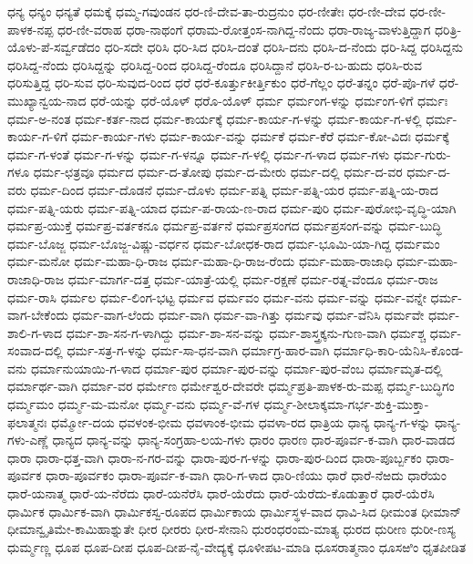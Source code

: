ಧನ್ಯ
ಧನ್ಯಂ
ಧನ್ಯತೆ
ಧಮಕ್ಕೆ
ಧಮ್ಮ-ಗವುಂಡನ
ಧರ-ಣಿ-ದೇವ-ತಾ-ರುದ್ರನುಂ
ಧರ-ಣೀತೇಃ
ಧರ-ಣೀ-ದೇವ
ಧರ-ಣೀ-ಪಾಳಕ-ನಪ್ಪ
ಧರ-ಣೀ-ವರಾಹ
ಧರಾ-ನಾಥಂಗೆ
ಧರಾಮ-ರೋತ್ತಂಸ-ನಾಗಿದ್ದ-ನೆಂದು
ಧರಾ-ರಾಜ್ಯ-ವಾಳುತ್ತಿದ್ದಾಗ
ಧರಿತ್ರಿ-ಯೊಳು-ಪೆ-ಸರ್ವ್ವಡೆದಂ
ಧರಿ-ಸದೇ
ಧರಿಸಿ
ಧರಿ-ಸಿದ
ಧರಿಸಿ-ದಂತೆ
ಧರಿಸಿ-ದನು
ಧರಿಸಿ-ದ-ನೆಂದು
ಧರಿ-ಸಿದ್ದ
ಧರಿಸಿದ್ದನು
ಧರಿಸಿದ್ದ-ನೆಂದು
ಧರಿಸಿದ್ದನ್ನು
ಧರಿಸಿದ್ದ-ರಿಂದ
ಧರಿಸಿದ್ದ-ರೆಂದೂ
ಧರಿಸಿದ್ದಾನೆ
ಧರಿಸಿ-ರ-ಬ-ಹುದು
ಧರಿಸಿ-ರುವ
ಧರಿಸುತ್ತಿದ್ದ
ಧರಿ-ಸುವ
ಧರಿ-ಸುವುದ-ರಿಂದ
ಧರೆ
ಧರೆ-ಕೂರ್ತ್ತುಕೀರ್ತ್ತಿಕುಂ
ಧರೆ-ಗೆಲ್ಲಂ
ಧರೆ-ತನ್ನಂ
ಧರೆ-ಪೊ-ಗಳೆ
ಧರೆ-ಮುಖ್ಯಾನ್ವಯ-ನಾದ
ಧರೆ-ಯನ್ನು
ಧರೆ-ಯೊಳ್
ಧರೊ-ಯೊಳ್
ಧರ್ಮ
ಧರ್ಮಂಗ-ಳನ್ನು
ಧರ್ಮಂಗ-ಳಿಗೆ
ಧರ್ಮಃ
ಧರ್ಮ-ಅ-ನಂತ
ಧರ್ಮ-ಕರ್ತ-ನಾದ
ಧರ್ಮ-ಕಾರ್ಯಕ್ಕೆ
ಧರ್ಮ-ಕಾರ್ಯ-ಗ-ಳನ್ನು
ಧರ್ಮ-ಕಾರ್ಯ-ಗ-ಳಲ್ಲಿ
ಧರ್ಮ-ಕಾರ್ಯ-ಗ-ಳಿಗೆ
ಧರ್ಮ-ಕಾರ್ಯ-ಗಳು
ಧರ್ಮ-ಕಾರ್ಯ-ವನ್ನು
ಧರ್ಮಕೆ
ಧರ್ಮ-ಕೆರೆ
ಧರ್ಮ-ಕೋ-ವಿದಃ
ಧರ್ಮಕ್ಕೆ
ಧರ್ಮ-ಗ-ಳಂತೆ
ಧರ್ಮ-ಗ-ಳನ್ನು
ಧರ್ಮ-ಗ-ಳನ್ನೂ
ಧರ್ಮ-ಗ-ಳಲ್ಲಿ
ಧರ್ಮ-ಗ-ಳಾದ
ಧರ್ಮ-ಗಳು
ಧರ್ಮ-ಗುರು-ಗಳೂ
ಧರ್ಮ-ಛತ್ರವೂ
ಧರ್ಮದ
ಧರ್ಮ-ದ-ತೋಪು
ಧರ್ಮ-ದ-ಮೇರು
ಧರ್ಮ-ದಲ್ಲಿ
ಧರ್ಮ-ದ-ವರ
ಧರ್ಮ-ದ-ವರು
ಧರ್ಮ-ದಿಂದ
ಧರ್ಮ-ದೊಡನೆ
ಧರ್ಮ-ದೊಳು
ಧರ್ಮ-ಪತ್ನಿ
ಧರ್ಮ-ಪತ್ನಿ-ಯರ
ಧರ್ಮ-ಪತ್ನಿ-ಯ-ರಾದ
ಧರ್ಮ-ಪತ್ನಿ-ಯರು
ಧರ್ಮ-ಪತ್ನಿ-ಯಾದ
ಧರ್ಮ-ಪ-ರಾಯ-ಣ-ರಾದ
ಧರ್ಮ-ಪುರಿ
ಧರ್ಮ-ಪುರೋಭಿ-ವೃದ್ಧಿ-ಯಾಗಿ
ಧರ್ಮಪ್ರ-ಯುಕ್ತೆ
ಧರ್ಮಪ್ರ-ವರ್ತಕನೂ
ಧರ್ಮಪ್ರ-ವರ್ತನೆ
ಧರ್ಮಪ್ರಸಂಗದ
ಧರ್ಮಪ್ರಸಂಗ-ವನ್ನು
ಧರ್ಮ-ಬುದ್ಧಿ
ಧರ್ಮ-ಬೊಜ್ಜ
ಧರ್ಮ-ಬೊಜ್ಜ-ವಿಷ್ಣು-ವರ್ಧನ
ಧರ್ಮ-ಬೋಧಕ-ರಾದ
ಧರ್ಮ-ಭೂಮಿ-ಯಾ-ಗಿದ್ದ
ಧರ್ಮಮಂ
ಧರ್ಮ-ಮನೋ
ಧರ್ಮ-ಮಹಾ-ಧಿ-ರಾಜ
ಧರ್ಮ-ಮಹಾ-ಧಿ-ರಾಜ-ರೆಂದು
ಧರ್ಮ-ಮಹಾ-ರಾಜಾಧಿ
ಧರ್ಮ-ಮಹಾ-ರಾಜಾಧಿ-ರಾಜ
ಧರ್ಮ-ಮಾರ್ಗ-ದತ್ತ
ಧರ್ಮ-ಯಾತ್ರೆ-ಯಲ್ಲಿ
ಧರ್ಮ-ರಕ್ಷಣೆ
ಧರ್ಮ-ರತ್ನ-ವೆಂದೂ
ಧರ್ಮ-ರಾಜ
ಧರ್ಮ-ರಾಸಿ
ಧರ್ಮಲ
ಧರ್ಮ-ಲಿಂಗ-ಭಟ್ಟ
ಧರ್ಮವ
ಧರ್ಮವಂ
ಧರ್ಮ-ವನು
ಧರ್ಮ-ವನ್ನು
ಧರ್ಮ-ವನ್ನೇ
ಧರ್ಮ-ವಾಗ-ಬೇಕೆಂದು
ಧರ್ಮ-ವಾಗ-ಲೆಂದು
ಧರ್ಮ-ವಾಗಿ
ಧರ್ಮ-ವಾ-ಗಿತ್ತು
ಧರ್ಮವು
ಧರ್ಮ-ವೆನಿಸಿ
ಧರ್ಮವೇ
ಧರ್ಮ-ಶಾಲಿ-ಗ-ಳಾದ
ಧರ್ಮ-ಶಾ-ಸನ-ಗ-ಳಾಗಿದ್ದು
ಧರ್ಮ-ಶಾ-ಸನ-ವನ್ನು
ಧರ್ಮ-ಶಾಸ್ತ್ರಕ್ಕನು-ಗುಣ-ವಾಗಿ
ಧರ್ಮಶ್ಚ
ಧರ್ಮ-ಸಂವಾದ-ದಲ್ಲಿ
ಧರ್ಮ-ಸತ್ರ-ಗ-ಳನ್ನು
ಧರ್ಮ-ಸಾ-ಧನ-ವಾಗಿ
ಧರ್ಮಾಗ್ರ-ಹಾರ-ವಾಗಿ
ಧರ್ಮಾಧಿ-ಕಾರಿ-ಯೆನಿಸಿ-ಕೊಂಡ-ವನು
ಧರ್ಮಾನುಯಾಯಿ-ಗ-ಳಾದ
ಧರ್ಮಾ-ಪುರ
ಧರ್ಮಾ-ಪುರ-ವನ್ನು
ಧರ್ಮಾ-ಪುರ-ವೆಂಬ
ಧರ್ಮಾಮೃತ-ದಲ್ಲಿ
ಧರ್ಮಾರ್ಥ-ವಾಗಿ
ಧರ್ಮಾ-ವರ
ಧರ್ಮೇಣ
ಧರ್ಮೇಶ್ವರ-ದೇವರೇ
ಧರ್ಮ್ಮಪ್ರತಿ-ಪಾಳಕ-ರು-ಮಪ್ಪ
ಧರ್ಮ್ಮ-ಬುದ್ಧಿಗಂ
ಧರ್ಮ್ಮಮಂ
ಧರ್ಮ್ಮ-ಮ-ಮನೋ
ಧರ್ಮ್ಮ-ವನು
ಧರ್ಮ್ಮ-ವೆ-ಗಳ
ಧರ್ಮ್ಮ-ಶೀಲಾಕ್ಕಮಾ-ಗರ್ಭ-ಶುಕ್ತಿ-ಮುಕ್ತಾ-ಫಲಾತ್ಮನಃ
ಧರ್ಮ್ಮೋ-ದಯ
ಧವಳಂಕ-ಭೀಮ
ಧವಳಾಂಕ-ಭೀಮ
ಧವಳಾ-ರದ
ಧಾತ್ರಿಯ
ಧಾನ್ಯ
ಧಾನ್ಯ-ಗ-ಳನ್ನು
ಧಾನ್ಯ-ಗಳು-ಎಣ್ಣೆ
ಧಾನ್ಯದ
ಧಾನ್ಯ-ವನ್ನು
ಧಾನ್ಯ-ಸಂಗ್ರಹಾ-ಲಯ-ಗಳು
ಧಾರಂ
ಧಾರಣ
ಧಾರ-ಪೂರ್ವ-ಕ-ವಾಗಿ
ಧಾರ-ವಾಡದ
ಧಾರಾ
ಧಾರಾ-ಧತ್ತ-ವಾಗಿ
ಧಾರಾ-ನ-ಗರ-ವನ್ನು
ಧಾರಾ-ಪುರ-ಗ-ಳನ್ನು
ಧಾರಾ-ಪುರ-ದಿಂದ
ಧಾರಾ-ಪೂರ್ಬ್ಬಕಂ
ಧಾರಾ-ಪೂರ್ವಕ
ಧಾರಾ-ಪೂರ್ವಕಂ
ಧಾರಾ-ಪೂರ್ವ-ಕ-ವಾಗಿ
ಧಾರಿ-ಗ-ಳಾದ
ಧಾರಿ-ಣಿಯು
ಧಾರೆ
ಧಾರೆ-ನೆಱದು
ಧಾರೆಯಂ
ಧಾರೆ-ಯನಾತ್ಮ
ಧಾರೆ-ಯ-ನೆರೆದು
ಧಾರೆ-ಯನೆರೆಸಿ
ಧಾರೆ-ಯೆರೆದು
ಧಾರೆ-ಯೆರೆದು-ಕೊಡುತ್ತಾರೆ
ಧಾರೆ-ಯೆರೆಸಿ
ಧಾರ್ಮಿಕ
ಧಾರ್ಮಿಕ-ವಾಗಿ
ಧಾರ್ಮಿಕಸ್ವ-ರೂಪದ
ಧಾರ್ಮಿಕಾಯ
ಧಾರ್ಮಿಸ್ಥಳ-ವಾದ
ಧಾವಿ-ಸಿದ
ಧೀಮಂತ
ಧೀಮಾನ್
ಧೀಮಾನ್ವೃತಿಮೇ-ಕಾಮಿಹಾಶ್ನುತೇ
ಧೀರ
ಧೀರರು
ಧೀರ-ಸೇನಾನಿ
ಧುರಂಧರಂಮ-ಮಾತ್ಯ
ಧುರದ
ಧುರೀಣ
ಧುರೀ-ಣಸ್ಯ
ಧುರ್ಮ್ಮಣ್ಣ
ಧೂಪ
ಧೂಪ-ದೀಪ
ಧೂಪ-ದೀಪ-ನೈ-ವೇದ್ಯಕ್ಕೆ
ಧೂಳೀಪಟ-ಮಾಡಿ
ಧೂಸರಾತ್ಮನಾಂ
ಧೂಸಱಿಂ
ಧೃತಪೀಡಿತ
